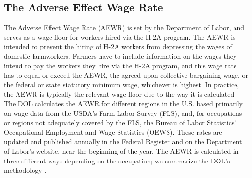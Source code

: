 \documentclass[14pt]{article}
\begin{document}
\subsection{The Adverse Effect Wage Rate}

The Adverse Effect Wage Rate (AEWR) is set by the Department of Labor, and serves as a wage floor for workers hired via the H-2A program.
The AEWR is intended to prevent the hiring of H-2A workers from depressing the wages of domestic farmworkers.
Farmers have to include information on the wages they intend to pay the workers they hire via the H-2A program, and this wage rate has to equal or exceed the AEWR, the agreed-upon collective bargaining wage, or the federal or state statutory minimum wage, whichever is highest.
In practice, the AEWR is typically the relevant wage floor due to the way it is calculated.
The DOL calculates the AEWR for different regions in the U.S. based primarily on wage data from the USDA's Farm Labor Survey (FLS), and, for occupations or regions not adequately covered by the FLS, the Bureau of Labor Statistics' Occupational Employment and Wage Statistics (OEWS).
These rates are updated and published annually in the Federal Register and on the Department of Labor's website, near the beginning of the year.
The AEWR is calculated in three different ways depending on the occupation; we summarize the DOL's methodology \parencite{dol_aewr}.
\end{document}
